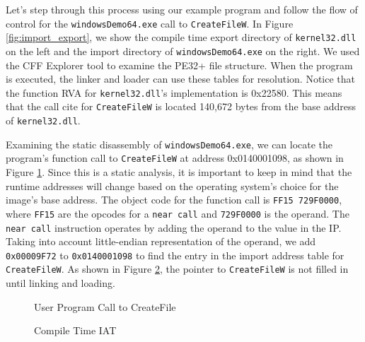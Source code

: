 \documentclass[preprint,12pt]{elsarticle}
\begin{document}
Let's step through this process using our example program and follow the flow of control for the \texttt{windowsDemo64.exe} call to \texttt{CreateFileW}. In Figure \ref{fig:import_export}, we show the compile time export directory of \texttt{kernel32.dll} on the left and the import directory of \texttt{windowsDemo64.exe} on the right. We used the CFF Explorer \cite{cffexplorer} tool to examine the PE32+ file structure. When the program is executed, the linker and loader can use these tables for resolution. Notice that the function RVA for \texttt{kernel32.dll}'s implementation is 0x22580. This means that the call cite for \texttt{CreateFileW} is located 140,672 bytes from the base address of \texttt{kernel32.dll}.

Examining the static disassembly of \texttt{windowsDemo64.exe}, we can locate the program's function call to \texttt{CreateFileW} at address 0x0140001098, as shown in Figure \ref{fig:windows64Demo_call_to_CreateFile}. Since this is a static analysis, it is important to keep in mind that the runtime addresses will change based on the operating system's choice for the image's base address. The object code for the function call is \texttt{FF15 729F0000}, where \texttt{FF15} are the opcodes for a \texttt{near call} and \texttt{729F0000} is the operand. The \texttt{near call} instruction operates by adding the operand to the value in the IP. Taking into account little-endian representation of the operand, we add \texttt{0x00009F72} to \texttt{0x0140001098} to find the entry in the import address table for \texttt{CreateFileW}. As shown in Figure \ref{fig:empty_IAT}, the pointer to \texttt{CreateFileW} is not filled in until linking and loading. 

\begin{figure}[ht]
\caption{User Program Call to CreateFile}
\label{fig:windows64Demo_call_to_CreateFile}
\end{figure}

\begin{figure}[ht]
\caption{Compile Time IAT}
\label{fig:empty_IAT}
\end{figure}
\end{document}
